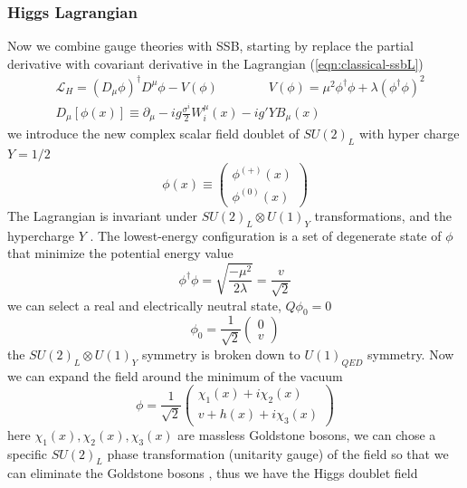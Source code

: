 \documentclass{report}
\numberwithin{equation}{section}
\begin{document}
\subsubsection{Higgs Lagrangian}
Now we combine gauge theories with SSB, starting by replace the partial derivative with covariant derivative in the Lagrangian (\ref{eqn:classical-ssbL})
\begin{equation}
\begin{split}
\label{eqn:L higgs}
&\mathcal{L}_H=(D_\mu\phi)^\dagger D^\mu \phi - V(\phi)\quad \quad\quad\quad V(\phi)=\mu^2 \phi^\dagger \phi + \lambda(\phi^\dagger \phi)^2\\
&D_\mu[\phi(x)]\equiv \partial_\mu -ig\frac{\sigma^i}{2}W^\mu_i(x)- ig'Y B_\mu(x)
\end{split}
\end{equation}
we introduce the new complex scalar field doublet of $SU(2)_L$ with hyper charge $Y=1/2$
\begin{equation}
\phi(x)\equiv \begin{pmatrix}
\phi^{(+)}(x)\\
\phi^{(0)}(x)
\end{pmatrix}
\end{equation}
The Lagrangian is invariant under $SU(2)_L \otimes U(1)_Y$ transformations, and the hypercharge $Y$
.
The lowest-energy configuration is a set of degenerate state of $\phi$ that minimize the potential energy value
\begin{equation}
\phi^\dagger \phi=\sqrt{\frac{-\mu^2}{2 \lambda}}=\frac{v}{\sqrt{2}}
\end{equation}
we can select a real and electrically neutral state, $Q\phi_0=0$
\begin{equation}
\phi_0=\frac{1}{\sqrt{2}}\begin{pmatrix}
0\\
v
\end{pmatrix}
\end{equation}
the $SU(2)_L\otimes U(1)_Y$ symmetry is broken down to $U(1)_{QED}$ symmetry. Now we can expand the field around the minimum of the vacuum 
\begin{equation}
\phi =\frac{1}{\sqrt{2}}\begin{pmatrix}
\chi_1(x)+i \chi_2(x)\\
v +h(x)+ i\chi_3(x)
\end{pmatrix}
\end{equation}
here $\chi_1(x),\chi_2(x),\chi_3(x)$ are massless Goldstone bosons, we can chose a specific $SU(2)_L$ phase transformation (unitarity gauge) of the field so that we can eliminate the Goldstone bosons , thus we have the Higgs doublet field
\end{document}
